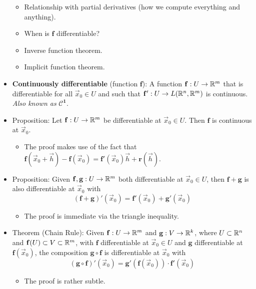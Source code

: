 \documentclass[../notes.tex]{subfiles}
\begin{document}
\begin{itemize}
\begin{itemize}
        \item Relationship with partial derivatives (how we compute everything and anything).
        \item When is $\mathbf{f}$ differentiable?
        \item Inverse function theorem.
        \item Implicit function theorem.
    \end{itemize}
    \item \textbf{Continuously differentiable} (function $\mathbf{f}$): A function $\mathbf{f}:U\to\mathbb{R}^m$ that is differentiable for all $\vec{x}_0\in U$ and such that $\mathbf{f}':U\to L(\mathbb{R}^n,\mathbb{R}^m)$ is continuous. \emph{Also known as} $\bm{\pmb{\mathscr{C}}^1}$.
    \item Proposition: Let $\mathbf{f}:U\to\mathbb{R}^m$ be differentiable at $\vec{x}_0\in U$. Then $\mathbf{f}$ is continuous at $\vec{x}_0$.
    \begin{itemize}
        \item The proof makes use of the fact that $\mathbf{f}(\vec{x}_0+\vec{h})-\mathbf{f}(\vec{x}_0)=\mathbf{f}'(\vec{x}_0)\vec{h}+\mathbf{r}(\vec{h})$.
    \end{itemize}
    \item Proposition: Given $\mathbf{f},\mathbf{g}:U\to\mathbb{R}^m$ both differentiable at $\vec{x}_0\in U$, then $\mathbf{f}+\mathbf{g}$ is also differentiable at $\vec{x}_0$ with
    \begin{equation*}
        (\mathbf{f}+\mathbf{g})'(\vec{x}_0)=\mathbf{f}'(\vec{x}_0)+\mathbf{g}'(\vec{x}_0)
    \end{equation*}
    \begin{itemize}
        \item The proof is immediate via the triangle inequality.
    \end{itemize}
    \item Theorem (Chain Rule): Given $\mathbf{f}:U\to\mathbb{R}^m$ and $\mathbf{g}:V\to\mathbb{R}^k$, where $U\subset\mathbb{R}^n$ and $\mathbf{f}(U)\subset V\subset\mathbb{R}^m$, with $\mathbf{f}$ differentiable at $\vec{x}_0\in U$ and $\mathbf{g}$ differentiable at $\mathbf{f}(\vec{x}_0)$, the composition $\mathbf{g}\circ\mathbf{f}$ is differentiable at $\vec{x}_0$ with
    \begin{equation*}
        (\mathbf{g}\circ\mathbf{f})'(\vec{x}_0) = \mathbf{g}'(\mathbf{f}(\vec{x}_0))\cdot\mathbf{f}'(\vec{x}_0)
    \end{equation*}
    \begin{itemize}
        \item The proof is rather subtle.

\end{itemize}
\end{itemize}
\end{document}
